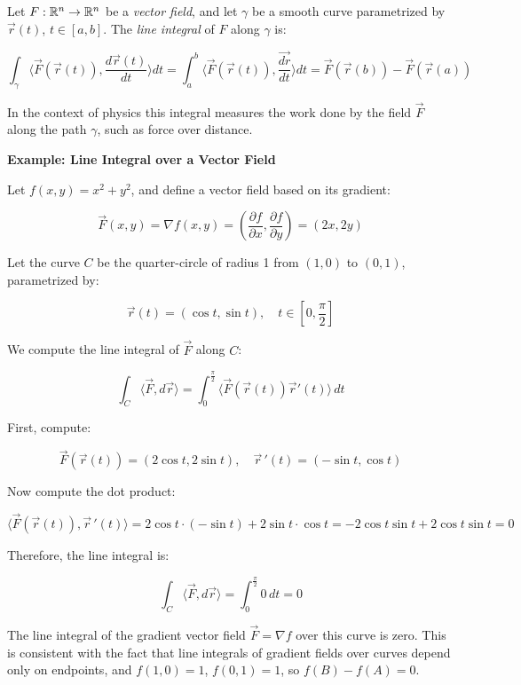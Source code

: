 Let \( F : \mathbb{R}^n \to \mathbb{R}^n \) be a \emph{vector field}, and let \( \gamma \) be a 
smooth curve parametrized by \( \vec{r}(t) \), \( t \in [a, b] \). 
The \emph{line integral} of \( F \) along \( \gamma \) is:

\[
    \int_\gamma \langle \vec{F}(\vec{r}(t)), \frac{d\vec{r}(t)}{dt} \rangle dt = \int_a^b \langle \vec{F}(\vec{r}(t)), \frac{\vec{dr}}{dt} \rangle dt = \vec{F}(\vec{r}(b)) - \vec{F}(\vec{r}(a))
\]

In the context of physics this integral measures the work done by the field \( \vec{F} \) along the path \( \gamma \), such as force over distance.
\vspace{\baselineskip}

\textbf{Example: Line Integral over a Vector Field}
\vspace{\baselineskip}

Let \( f(x, y) = x^2 + y^2 \), and define a vector field based on its gradient:

\[
    \vec{F}(x, y) = \nabla f(x, y) = \left( \frac{\partial f}{\partial x}, \frac{\partial f}{\partial y} \right) = (2x, 2y)
\]

Let the curve \( C \) be the quarter-circle of radius 1 from \( (1, 0) \) to \( (0, 1) \), 
parametrized by:

\[
    \vec{r}(t) = (\cos t, \sin t), \quad t \in \left[0, \frac{\pi}{2}\right]
\]

We compute the line integral of \( \vec{F} \) along \( C \):

\[
    \int_C \langle \vec{F}, d\vec{r}\rangle = \int_0^{\frac{\pi}{2}} \langle\vec{F}(\vec{r}(t)) \vec{r}'(t) \rangle\, dt
\]

First, compute:

\[
    \vec{F}(\vec{r}(t)) = (2\cos t, 2\sin t), \quad \vec{r}\,'(t) = (-\sin t, \cos t)
\]

Now compute the dot product:

\[
    \langle\vec{F}(\vec{r}(t)), \vec{r}\,'(t)\rangle = 2\cos t \cdot (-\sin t) + 2\sin t \cdot \cos t = -2\cos t \sin t + 2\cos t \sin t = 0
\]

Therefore, the line integral is:

\[
    \int_C \langle \vec{F}, d\vec{r}\rangle = \int_0^{\frac{\pi}{2}} 0 \, dt = 0
\]

The line integral of the gradient vector field \( \vec{F} = \nabla f \) over this curve is zero. 
This is consistent with the fact that line integrals of gradient fields over 
curves depend only on endpoints, and  \(f(1,0) = 1 \), \(f(0,1) = 1 \), so \( f(B) - f(A) = 0 \).


